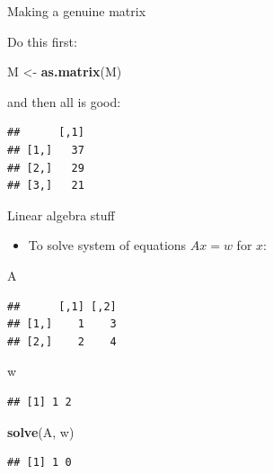 \documentclass[ignorenonframetext,]{beamer}
\newenvironment{Shaded}{\begin{snugshade}}{\end{snugshade}}
\newcommand{\KeywordTok}[1]{\textcolor[rgb]{0.13,0.29,0.53}{\textbf{#1}}}
\newcommand{\NormalTok}[1]{#1}
\newcommand{\OperatorTok}[1]{\textcolor[rgb]{0.81,0.36,0.00}{\textbf{#1}}}
\newcommand{\StringTok}[1]{\textcolor[rgb]{0.31,0.60,0.02}{#1}}
\providecommand{\tightlist}{%
  \setlength{\itemsep}{0pt}\setlength{\parskip}{0pt}}
\begin{document}
\begin{frame}[fragile]{Making a genuine matrix}
\protect\hypertarget{making-a-genuine-matrix}{}

Do this first:

\begin{Shaded}
\begin{Highlighting}[]
\NormalTok{M <-}\StringTok{ }\KeywordTok{as.matrix}\NormalTok{(M)}
\end{Highlighting}
\end{Shaded}

and then all is good:

\begin{Shaded}
\end{Shaded}

\begin{verbatim}
##      [,1]
## [1,]   37
## [2,]   29
## [3,]   21
\end{verbatim}

\end{frame}

\begin{frame}[fragile]{Linear algebra stuff}
\protect\hypertarget{linear-algebra-stuff}{}

\begin{itemize}
\tightlist
\item
  To solve system of equations \(Ax = w\) for \(x\):
\end{itemize}

\begin{Shaded}
\begin{Highlighting}[]
\NormalTok{A}
\end{Highlighting}
\end{Shaded}

\begin{verbatim}
##      [,1] [,2]
## [1,]    1    3
## [2,]    2    4
\end{verbatim}

\begin{Shaded}
\begin{Highlighting}[]
\NormalTok{w}
\end{Highlighting}
\end{Shaded}

\begin{verbatim}
## [1] 1 2
\end{verbatim}

\begin{Shaded}
\begin{Highlighting}[]
\KeywordTok{solve}\NormalTok{(A, w)}
\end{Highlighting}
\end{Shaded}

\begin{verbatim}
## [1] 1 0
\end{verbatim}

\end{frame}
\end{document}

